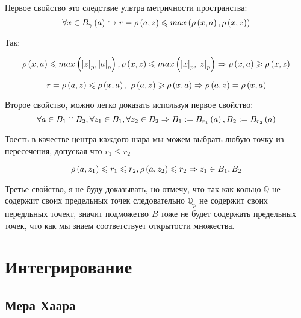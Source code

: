 Первое свойство это следствие ультра метричности пространства:
\begin{equation*}
    \forall x \in B_\gamma \left( a \right) \hookrightarrow r = \rho \left( a, z \right) 
    \leqslant max\left( \rho \left( x, a \right), \rho \left( x, z \right) \right)  
\end{equation*}

Так:

\begin{equation*}
    \rho \left( x, a \right) \leqslant max \left( \abs{z}_p, \abs{a}_p \right), \rho \left( x, z \right) \leqslant max \left( \abs{x}_p, \abs{z}_p \right) \Rightarrow \rho \left( x, a \right) \geqslant \rho \left( x, z \right)
\end{equation*}

\begin{equation*}
    r = \rho \left( a, z \right) \leqslant \rho \left( x, a \right), \ \rho \left( a, z \right) \geqslant \rho \left( x, a \right) \Rightarrow \rho \left( a, z \right) = \rho \left( x, a \right)
\end{equation*}

Второе свойство, можно легко доказать используя первое свойство:
\begin{equation*}
    \forall a \in B_1 \cap B_2,\forall z_1 \in B_1,\forall z_2 \in B_2 \Rightarrow B_1 := B_{r_1} \left( a \right), B_2 := B_{r_2} \left( a \right)
\end{equation*}

Тоесть в качестве центра каждого шара мы можем выбрать любую точку из пересечения, допуская что $r_1 \leq r_2$

\begin{equation*}
    \rho \left( a, z_1 \right) \leqslant r_1 \leqslant r_2, \rho \left( a, z_2 \right) \leqslant r_2 \Rightarrow z_1 \in B_1, B_2
\end{equation*}

Третье свойство, я не буду доказывать, но отмечу, что так как кольцо $\mathbb{Q}$ не содержит 
своих предельных точек следовательно $\mathbb{Q}_p$ не содержит своих передльных точект, значит подможетво 
$B$ тоже не будет содержать предельных точек, что как мы знаем соответствует открытости множества.

\section{Интегрирование}


\subsection*{Мера Хаара}







